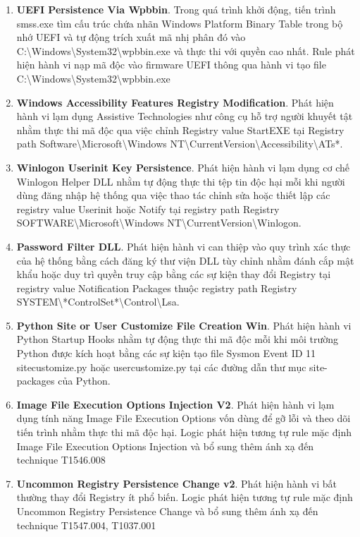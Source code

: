\begin{enumerate}
\item \textbf{UEFI Persistence Via Wpbbin}. Trong quá trình khởi động, tiến trình smss.exe tìm cấu trúc chứa nhãn Windows Platform Binary Table trong bộ nhớ UEFI và tự động trích xuất mã nhị phân đó vào C:\textbackslash{}Windows\textbackslash{}System32\textbackslash{}wpbbin.exe và thực thi với quyền cao nhất. Rule phát hiện hành vi nạp mã độc vào firmware UEFI thông qua hành vi tạo file C:\textbackslash{}Windows\textbackslash{}System32\textbackslash{}wpbbin.exe
\item \textbf{Windows Accessibility Features Registry Modification}. Phát hiện hành vi lạm dụng Assistive Technologies như công cụ hỗ trợ người khuyết tật nhằm thực thi mã độc qua việc chỉnh Registry value StartEXE tại Registry path Software\textbackslash{}Microsoft\textbackslash{}Windows NT\textbackslash{}CurrentVersion\textbackslash{}Accessibility\textbackslash{}ATs*.
\item \textbf{Winlogon Userinit Key Persistence}. Phát hiện hành vi lạm dụng cơ chế Winlogon Helper DLL nhằm tự động thực thi tệp tin độc hại mỗi khi người dùng đăng nhập hệ thống qua việc thao tác chỉnh sửa hoặc thiết lập các registry value Userinit hoặc Notify tại registry path Registry SOFTWARE\textbackslash{}Microsoft\textbackslash{}Windows NT\textbackslash{}CurrentVersion\textbackslash{}Winlogon.
\item \textbf{Password Filter DLL}. Phát hiện hành vi can thiệp vào quy trình xác thực của hệ thống bằng cách đăng ký thư viện DLL tùy chỉnh nhằm đánh cắp mật khẩu hoặc duy trì quyền truy cập bằng các sự kiện thay đổi Registry tại registry value Notification Packages thuộc registry path Registry SYSTEM\textbackslash{}*ControlSet*\textbackslash{}Control\textbackslash{}Lsa.
\item \textbf{Python Site or User Customize File Creation Win}. Phát hiện hành vi Python Startup Hooks nhằm tự động thực thi mã độc mỗi khi môi trường Python được kích hoạt bằng các sự kiện tạo file Sysmon Event ID 11 sitecustomize.py hoặc usercustomize.py tại các đường dẫn thư mục site-packages của Python.
\item \textbf{Image File Execution Options Injection V2}. Phát hiện hành vi lạm dụng tính năng Image File Execution Options vốn dùng để gỡ lỗi và theo dõi tiến trình nhằm thực thi mã độc hại. Logic phát hiện tương tự rule mặc định Image File Execution Options Injection và bổ sung thêm ánh xạ đến technique T1546.008
\item \textbf{Uncommon Registry Persistence Change v2}. Phát hiện hành vi bất thường thay đổi Registry ít phổ biến. Logic phát hiện tương tự rule mặc định Uncommon Registry Persistence Change và bổ sung thêm ánh xạ đến technique T1547.004, T1037.001

\end{enumerate}
